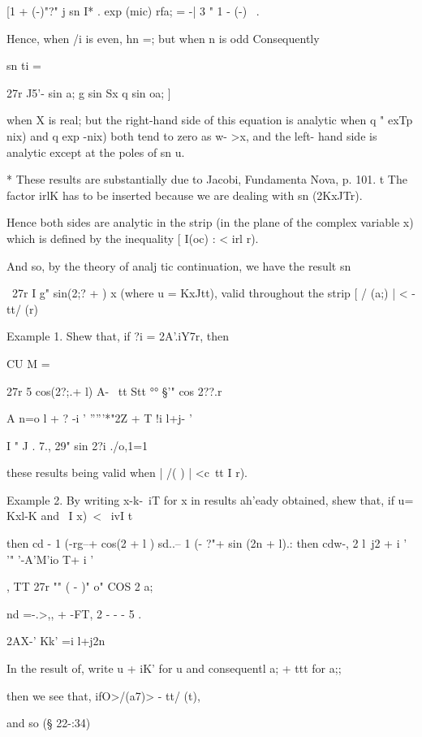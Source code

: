 [1 + (-)"?" j sn I* . exp (mic) rfa; = -| 3 " 1 - (-)~ .

Hence, when /i is even, hn =; but when n is odd Consequently

sn ti =

27r J5'- sin a; g sin Sx q sin oa; ]

when X is real; but the right-hand side of this equation is analytic
when q " exTp nix) and q exp -nix) both tend to zero as w- >x, and the
left- hand side is analytic except at the poles of sn u.

* These results are substantially due to Jacobi, Fundamenta Nova, p.
101. t The factor irlK has to be inserted because we are dealing with
sn (2KxJTr).

%
%

Hence both sides are analytic in the strip (in the plane of the
complex variable x) which is defined by the inequality [ I(oc) : < irl
r).

And so, by the theory of analj tic continuation, we have the result sn

\ 27r I g" sin(2;? + ) x (where u = KxJtt), valid throughout the strip
[ / (a;) | < - tt/ (r)

Example 1. Shew that, if ?i = 2A'.iY7r, then

CU M =

27r 5 cos(2?;.+ l) A- \ tt Stt °° §'" cos 2??.r

A n=o l + ? -i ' '''''*"2Z + T !i l+j- '

I " J . 7., 29" sin 2?i ./o,1=1 %

these results being valid when | /( ) | <c\ tt I r).

Example 2. By writing x-k-\ iT for x in results ah'eady obtained, shew
that, if u= Kxl-K and \ I x)\ < \ ivI t\

then cd - 1 (-rg--+ cos(2 + l ) sd..-- 1 (- ?"+ sin (2n + l).: then
cdw-, 2 l\ j2 + i ' '" '-A'M'io T+ i '

, TT 27r "" ( - )" o" COS 2 a;

nd =-.>,, + -FT, 2 - - - 5 .

2AX-' Kk' =i l+j2n


In the result of, write u + iK' for u and consequentl a; + ttt
for a;;

then we see that, ifO>/(a7)> - tt/ (t),

and so (§ 22-:34)

